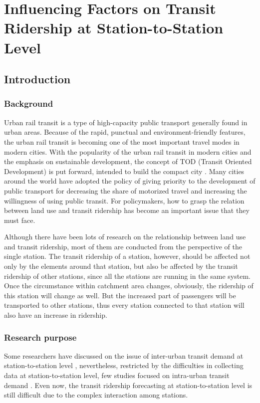\chapter{Influencing Factors on Transit Ridership at Station-to-Station Level}

\section{Introduction}
\subsection{Background}
%
Urban rail transit is a type of high-capacity public transport generally found in urban areas. Because of the rapid, punctual and environment-friendly features, the urban rail transit is becoming one of the most important travel modes in modern cities. With the popularity of the urban rail transit in modern cities and the emphasis on sustainable development, the concept of TOD (Transit Oriented Development) is put forward, intended to build the compact city \cite{calthorpe1993next}. Many cities around the world have adopted the policy of giving priority to the development of public transport for decreasing the share of motorized travel and increasing the willingness of using public transit. For policymakers, how to grasp the relation between land use and transit ridership has become an important issue that they must face.

%
Although there have been lots of research on the relationship between land use and transit ridership, most of them are conducted from the perspective of the single station. The transit ridership of a station, however, should be affected not only by the elements around that station, but also be affected by the transit ridership of other stations, since all the stations are running in the same system.  Once the circumstance within catchment area changes, obviously, the ridership of this station will change as well. But the increased part of passengers will be transported to other stations, thus every station connected to that station will also have an increase in ridership. 

\subsection{Research purpose}
%
Some researchers have discussed on the issue of inter-urban transit demand at station-to-station level \cite{wardman1997inter,jones1983demand}, nevertheless, restricted by the difficulties in collecting data at station-to-station level, few studies focused on intra-urban transit demand \cite{choi2012analysis}. Even now, the transit ridership forecasting at station-to-station level is still difficult due to the complex interaction among stations. 

